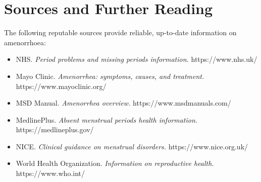 \section*{Sources and Further Reading}
The following reputable sources provide reliable, up-to-date information on amenorrhoea:

\begin{itemize}
    \item NHS. \textit{Period problems and missing periods information.} https://www.nhs.uk/
    \item Mayo Clinic. \textit{Amenorrhea: symptoms, causes, and treatment.} https://www.mayoclinic.org/
    \item MSD Manual. \textit{Amenorrhea overview.} https://www.msdmanuals.com/
    \item MedlinePlus. \textit{Absent menstrual periods health information.} https://medlineplus.gov/
    \item NICE. \textit{Clinical guidance on menstrual disorders.} https://www.nice.org.uk/
    \item World Health Organization. \textit{Information on reproductive health.} https://www.who.int/
\end{itemize}
